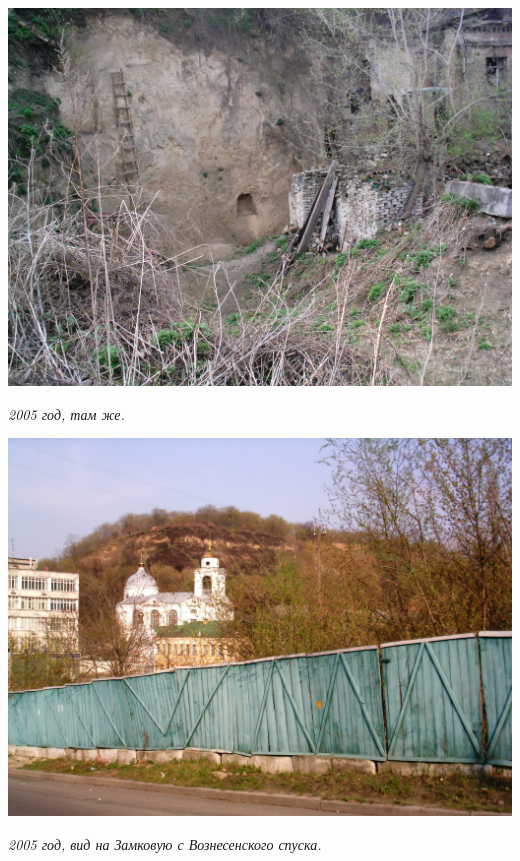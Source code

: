\begin{center}
\includegraphics[width=\linewidth]{chast-colebanie-osnov/gora-zamkovaya-valovaya/imag0025.jpg}

\textit{2005 год, там же.}
\end{center}

\begin{center}
\includegraphics[width=\linewidth]{chast-colebanie-osnov/gora-zamkovaya-valovaya/imag0026.jpg}

\textit{2005 год, вид на Замковую с Вознесенского спуска.}
\end{center}

